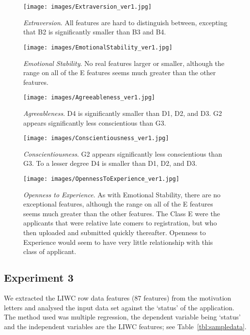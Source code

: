 \documentclass[letterpaper]{article}
\begin{document}
\begin{figure*}[!hp]
\centering
\texttt{[image: images/Extraversion\_ver1.jpg]}
\caption{{\emph{Extraversion}}. All features are hard to distinguish between, excepting that B2 is
significantly smaller than B3 and B4.}
\label{fig:extraversion}
\end{figure*}

\begin{figure*}[!hp]
\centering
\texttt{[image: images/EmotionalStability\_ver1.jpg]}
\caption{{\emph{Emotional Stability}}. No real features larger or smaller, although the range on all of the E
features seems much greater than the other features.}
\label{fig:emotstab}
\end{figure*}

\begin{figure*}[!hp]
\centering
\texttt{[image: images/Agreeableness\_ver1.jpg]}
\caption{{\emph{Agreeableness}}. D4 is significantly smaller than D1, D2, and D3. G2 appears
significantly less conscientious than G3.}
\label{fig:agreeableness}
\end{figure*}

\begin{figure*}[!hp]
\centering
\texttt{[image: images/Conscientiousness\_ver1.jpg]}
\caption{{\emph{Conscientiousness}}. G2 appears significantly less conscientious than G3. To a lesser
degree D4 is smaller than D1, D2, and D3.}
\label{fig:conscientiousness}
\end{figure*}

\begin{figure*}[!hp]
\centering
\texttt{[image: images/OpennessToExperience\_ver1.jpg]}
\caption{{\emph{Openness to Experience}}. As with Emotional Stability, there are no exceptional features,
although the range on all of the E features seems much greater than
the other features. The Class E were the applicants that were relative
late comers to registration, but who then uploaded and submitted
quickly thereafter. Openness to Experience would seem to have very
little relationship with this class of applicant.}
\label{fig:openexp}
\end{figure*}

\subsection{Experiment 3}

We extracted the LIWC row data features (87 features) from the
motivation letters and analysed the input data set against the
`status' of the application. The method used was multiple regression,
the dependent variable being `status' and the independent variables
are the LIWC features; see Table~\ref{tbl:sampledata}.
\end{document}
